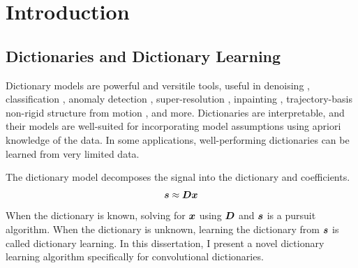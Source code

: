 \chapter{Introduction}


\section{Dictionaries and Dictionary Learning}
Dictionary models are powerful and versitile tools, useful in denoising \cite{wohlberg2016convolutional}, classification \cite{kong2012dictionary}, anomaly detection \cite{carroll2017outlier}, super-resolution \cite{polatkan2014bayesian}\cite{gu2015convolutional}, inpainting \cite{papyan2017convolutional}, trajectory-basis non-rigid structure from motion \cite{zhu2013convolutional}\cite{chodosh2020use}, and more. Dictionaries are interpretable, and their models are well-suited for incorporating model assumptions using apriori knowledge of the data. In some applications, well-performing dictionaries can be learned from very limited data.

The dictionary model decomposes the signal into the dictionary and coefficients.
%
\begin{equation}
\bm{s} \approx \bm{D}\bm{x}
\end{equation}
%
When the dictionary is known, solving for $\bm{x}$ using $\bm{D}$ and $\bm{s}$ is a pursuit algorithm. When the dictionary is unknown, learning the dictionary from $\bm{s}$ is called dictionary learning. In this dissertation, I present a novel dictionary learning algorithm specifically for convolutional dictionaries.

